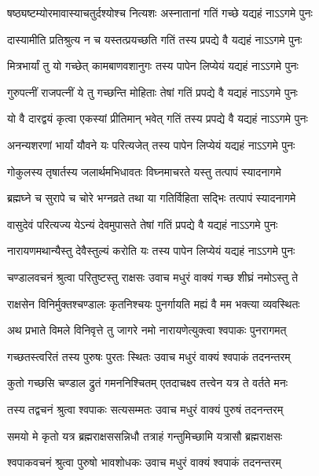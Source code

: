 \twolineshloka
{षष्ठ्यष्टम्योरमावास्याचतुर्दश्योश्च नित्यशः}
{अस्नातानां गतिं गच्छे यद्यहं नाऽऽगमे पुनः}%

\twolineshloka
{दास्यामीति प्रतिश्रुत्य न च यस्तत्प्रयच्छति}
{गतिं तस्य प्रपद्ये वै यद्यहं नाऽऽगमे पुनः}%

\twolineshloka
{मित्रभार्यां तु यो गच्छेत् कामबाणवशानुगः}
{तस्य पापेन लिप्येयं यद्यहं नाऽऽगमे पुनः}%

\twolineshloka
{गुरुपत्नीं राजपत्नीं ये तु गच्छन्ति मोहिताः}
{तेषां गतिं प्रपद्ये वै यद्यहं नाऽऽगमे पुनः}%

\twolineshloka
{यो वै दारद्वयं कृत्वा एकस्यां प्रीतिमान् भवेत्}
{गतिं तस्य प्रपद्ये वै यद्यहं नाऽऽगमे पुनः}%

\twolineshloka
{अनन्यशरणां भार्यां यौवने यः परित्यजेत्}
{तस्य पापेन लिप्येयं यद्यहं नाऽऽगमे पुनः}%

\twolineshloka
{गोकुलस्य तृषार्तस्य जलार्थमभिधावतः}
{विघ्नमाचरते यस्तु तत्पापं स्यादनागमे}%

\twolineshloka
{ब्रह्मघ्ने च सुरापे च चोरे भग्नव्रते तथा}
{या गतिर्विहिता सद्भिः तत्पापं स्यादनागमे}%

\twolineshloka
{वासुदेवं परित्यज्य येऽन्यं देवमुपासते}
{तेषां गतिं प्रपद्ये वै यद्यहं नाऽऽगमे पुनः}%

\twolineshloka
{नारायणमथान्यैस्तु देवैस्तुल्यं करोति यः}
{तस्य पापेन लिप्येयं यद्यहं नाऽऽगमे पुनः}%

\twolineshloka
{चण्डालवचनं श्रुत्वा परितुष्टस्तु राक्षसः}
{उवाच मधुरं वाक्यं गच्छ शीघ्रं नमोऽस्तु ते}%

\twolineshloka
{राक्षसेन विनिर्मुक्तश्चण्डालः कृतनिश्चयः}
{पुनर्गायति मह्यं वै मम भक्त्या व्यवस्थितः}%

\twolineshloka
{अथ प्रभाते विमले विनिवृत्ते तु जागरे}
{नमो नारायणेत्युक्त्वा श्वपाकः पुनरागमत्}%

\twolineshloka
{गच्छतस्त्वरितं तस्य पुरुषः पुरतः स्थितः}
{उवाच मधुरं वाक्यं श्वपाकं तदनन्तरम्}%

\twolineshloka
{कुतो गच्छसि चण्डाल द्रुतं गमननिश्चितम्}
{एतदाचक्ष्व तत्त्वेन यत्र ते वर्तते मनः}%

\twolineshloka
{तस्य तद्वचनं श्रुत्वा श्वपाकः सत्यसम्मतः}
{उवाच मधुरं वाक्यं पुरुषं तदनन्तरम्}%

\twolineshloka
{समयो मे कृतो यत्र ब्रह्मराक्षससन्निधौ}
{तत्राहं गन्तुमिच्छामि यत्रासौ ब्रह्मराक्षसः}%

\twolineshloka
{श्वपाकवचनं श्रुत्वा पुरुषो भावशोधकः}
{उवाच मधुरं वाक्यं श्वपाकं तदनन्तरम्}%

